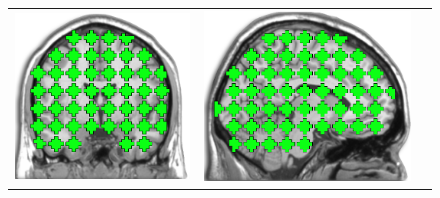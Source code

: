 \renewcommand{\imheight}  {0.23\linewidth}
\setlength{\tabcolsep}{11pt} %
\begin{figure}[t!]\vspace{-7pt}
	\centering
	\vspace{0pt}
	\begin{tabular}{ccc}
		\includegraphics[height=\imheight]{roi_slice_cor.png}&
		\includegraphics[height=\imheight]{roi_slice_sag.png}&

\end{tabular}
\end{figure}
